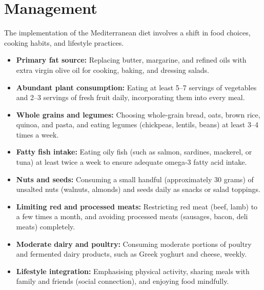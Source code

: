 \section*{Management}
The implementation of the Mediterranean diet involves a shift in food choices, cooking habits, and lifestyle practices.
\begin{itemize}
    \item \textbf{Primary fat source:} Replacing butter, margarine, and refined oils with extra virgin olive oil for cooking, baking, and dressing salads.
    \item \textbf{Abundant plant consumption:} Eating at least 5--7 servings of vegetables and 2--3 servings of fresh fruit daily, incorporating them into every meal.
    \item \textbf{Whole grains and legumes:} Choosing whole-grain bread, oats, brown rice, quinoa, and pasta, and eating legumes (chickpeas, lentils, beans) at least 3--4 times a week.
    \item \textbf{Fatty fish intake:} Eating oily fish (such as salmon, sardines, mackerel, or tuna) at least twice a week to ensure adequate omega-3 fatty acid intake.
    \item \textbf{Nuts and seeds:} Consuming a small handful (approximately 30 grams) of unsalted nuts (walnuts, almonds) and seeds daily as snacks or salad toppings.
    \item \textbf{Limiting red and processed meats:} Restricting red meat (beef, lamb) to a few times a month, and avoiding processed meats (sausages, bacon, deli meats) completely.
    \item \textbf{Moderate dairy and poultry:} Consuming moderate portions of poultry and fermented dairy products, such as Greek yoghurt and cheese, weekly.
    \item \textbf{Lifestyle integration:} Emphasising physical activity, sharing meals with family and friends (social connection), and enjoying food mindfully.
\end{itemize}

